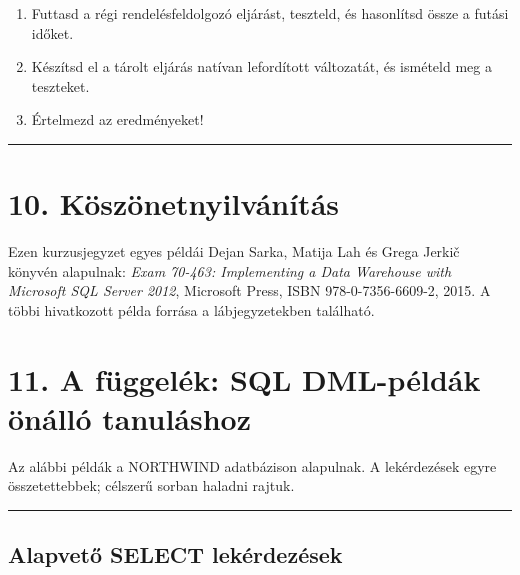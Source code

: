 \documentclass[
  magyar,
]{article}
\providecommand{\tightlist}{%
  \setlength{\itemsep}{0pt}\setlength{\parskip}{0pt}}
\begin{document}
\begin{enumerate}
\def\labelenumi{\arabic{enumi}.}
\setcounter{enumi}{5}
\tightlist
\item
  Futtasd a régi rendelésfeldolgozó eljárást, teszteld, és hasonlítsd
  össze a futási időket.
\item
  Készítsd el a tárolt eljárás natívan lefordított változatát, és
  ismételd meg a teszteket.
\item
  Értelmezd az eredményeket!
\end{enumerate}

\begin{center}\rule{0.5\linewidth}{0.5pt}\end{center}

\section{10.
Köszönetnyilvánítás}\label{kuxf6szuxf6netnyilvuxe1nuxedtuxe1s}

Ezen kurzusjegyzet egyes példái Dejan Sarka, Matija Lah és Grega Jerkič
könyvén alapulnak: \emph{Exam 70-463: Implementing a Data Warehouse with
Microsoft SQL Server 2012}, Microsoft Press, ISBN 978-0-7356-6609-2,
2015. A többi hivatkozott példa forrása a lábjegyzetekben található.

\section{11. A függelék: SQL DML-példák önálló
tanuláshoz}\label{a-fuxfcggeluxe9k-sql-dml-puxe9lduxe1k-uxf6nuxe1lluxf3-tanuluxe1shoz}

Az alábbi példák a NORTHWIND adatbázison alapulnak. A lekérdezések egyre
összetettebbek; célszerű sorban haladni rajtuk.

\begin{center}\rule{0.5\linewidth}{0.5pt}\end{center}

\subsection{Alapvető SELECT
lekérdezések}\label{alapvetux151-select-lekuxe9rdezuxe9sek}
\end{document}
